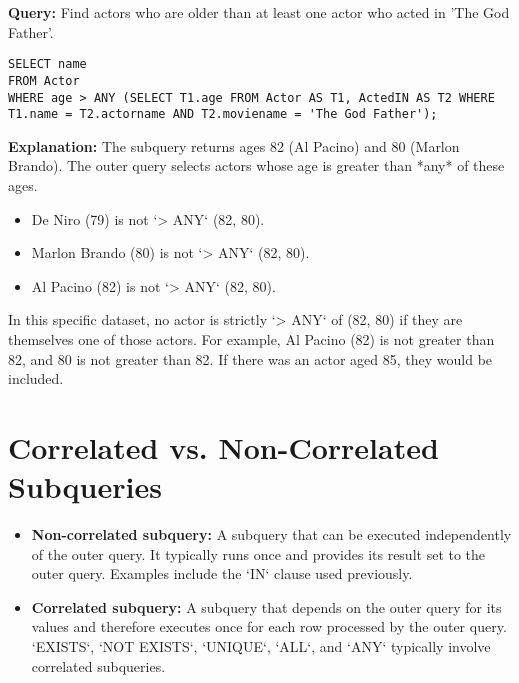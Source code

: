 \documentclass{article}
\begin{document}
\textbf{Query:} Find actors who are older than at least one actor who acted in 'The God Father'. 
\begin{lstlisting}
SELECT name
FROM Actor
WHERE age > ANY (SELECT T1.age FROM Actor AS T1, ActedIN AS T2 WHERE T1.name = T2.actorname AND T2.moviename = 'The God Father');
\end{lstlisting}
\textbf{Explanation:} The subquery returns ages 82 (Al Pacino) and 80 (Marlon Brando). The outer query selects actors whose age is greater than *any* of these ages.
\begin{itemize}
    \item De Niro (79) is not `> ANY` (82, 80).
    \item Marlon Brando (80) is not `> ANY` (82, 80).
    \item Al Pacino (82) is not `> ANY` (82, 80).
\end{itemize}
In this specific dataset, no actor is strictly `> ANY` of (82, 80) if they are themselves one of those actors. For example, Al Pacino (82) is not greater than 82, and 80 is not greater than 82. If there was an actor aged 85, they would be included.

\section*{Correlated vs. Non-Correlated Subqueries}
\begin{itemize}
    \item \textbf{Non-correlated subquery:} A subquery that can be executed independently of the outer query. It typically runs once and provides its result set to the outer query. Examples include the `IN` clause used previously.
    \item \textbf{Correlated subquery:} A subquery that depends on the outer query for its values and therefore executes once for each row processed by the outer query. `EXISTS`, `NOT EXISTS`, `UNIQUE`, `ALL`, and `ANY` typically involve correlated subqueries.
\end{itemize}
\end{document}
